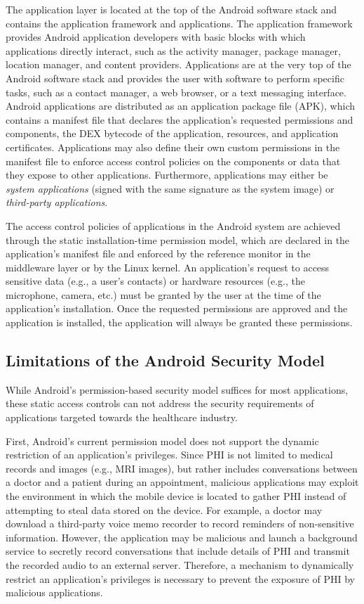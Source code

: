 The application layer is located at the top of the Android 
software stack and contains the application framework and 
applications. The application framework provides Android 
application developers with basic blocks with which 
applications directly interact, such as the activity manager,
package manager, location manager, and content providers.
Applications are at the very top of the Android software stack
and provides the user with software to perform specific tasks,
such as a contact manager, a web browser, or a text messaging
interface.  Android applications are distributed as an application
package file (APK), which contains a manifest file that declares
the application's requested permissions and components, the DEX
bytecode of the application, resources, and application
certificates.  Applications may also define their own custom
permissions in the manifest file to enforce access control
policies on the components or data that they expose to other
applications.  Furthermore, applications may either be
\textit{system applications} (signed with the same signature
as the system image) or \textit{third-party applications}.

The access control policies of applications in the Android
system are achieved through the static installation-time
permission model, which are declared in the application's
manifest file and enforced by the reference monitor in the
middleware layer or by the Linux kernel.  An application's
request to access sensitive data (e.g., a user's contacts)
or hardware resources (e.g., the microphone, camera, etc.)
must be granted by the user at the time of the application's
installation.  Once the requested permissions are approved
and the application is installed, the application will always
be granted these permissions.

\subsection{Limitations of the Android Security Model}

While Android's permission-based security model suffices for
most applications, these static access controls can not address
the security requirements of applications targeted towards
the healthcare industry.

First, Android's current permission model does not support the
dynamic restriction of an application's privileges.  Since PHI
is not limited to medical records and images (e.g., MRI images),
but rather includes conversations between a doctor and a patient
during an appointment, malicious applications may exploit the
environment in which the mobile device is located to gather PHI
instead of attempting to steal data stored on the device.  For
example, a doctor may download a third-party voice memo recorder
to record reminders of non-sensitive information.  However, the
application may be malicious and launch a background service to
secretly record conversations that include details of PHI and
transmit the recorded audio to an external server.  Therefore,
a mechanism to dynamically restrict an application's privileges
is necessary to prevent the exposure of PHI by malicious
applications.

